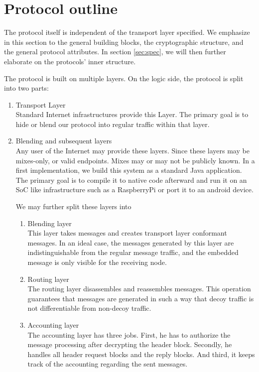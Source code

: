 \section{Protocol outline}
The protocol itself is independent of the transport layer specified. We emphasize in this section to the general building blocks, the cryptographic structure, and the general protocol attributes. In section \ref{sec:spec}, we will then further elaborate on the protocols' inner structure.

The protocol is built on multiple layers. On the logic side, the protocol is split into two parts:
\begin{enumerate}
	\item Transport Layer\\
	Standard Internet infrastructures provide this Layer. The primary goal is to hide or blend our protocol into regular traffic within that layer.
	\item Blending and subsequent layers\\
	Any user of the Internet may provide these layers. Since these layers may be mixes-only, or valid endpoints. Mixes may or may not be publicly known. In a first implementation, we build this system as a standard Java application. The primary goal is to compile it to native code afterward and run it on an SoC like infrastructure such as a RaspberryPi or port it to an android device.
	
	We may further split these layers into
	\begin{enumerate}
		\item Blending layer\\
		This layer takes messages and creates transport layer conformant messages. In an ideal case, the messages generated by this layer are indistinguishable from the regular message traffic, and the embedded message is only visible for the receiving node.
		\item Routing layer\\
		The routing layer disassembles and reassembles messages. This operation guarantees that messages are generated in such a way that decoy traffic is not differentiable from non-decoy traffic.
		\item Accounting layer\\
		The accounting layer has three jobs. First, he has to authorize the message processing after decrypting the header block. Secondly, he handles all header request blocks and the reply blocks. And third, it keeps track of the accounting regarding the sent messages.    
	\end{enumerate}
\end{enumerate}

